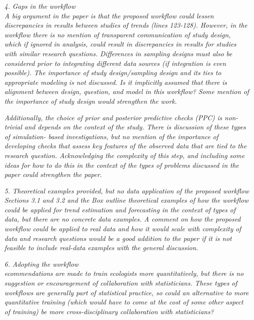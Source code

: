 \documentclass[11pt,letter]{article}
\begin{document}
\begin{mybox}
\emph{4. Gaps in the workflow\\
A big argument in the paper is that the proposed workflow
could lessen discrepancies in results between studies of trends (lines 123-128). However,
in the workflow there is no mention of transparent communication of study design, which
if ignored in analysis, could result in discrepancies in results for studies with similar
research questions. Differences in sampling designs must also be considered prior to
integrating different data sources (if integration is even possible). The importance of
study design/sampling design and its ties to appropriate modeling is not discussed. Is it
implicitly assumed that there is alignment between design, question, and model in this
workflow? Some mention of the importance of study design would strengthen the work.}
\end{mybox}

\begin{mybox}
\emph{Additionally, the choice of prior and posterior predictive checks (PPC) is non-trivial and
depends on the context of the study. There is discussion of these types of simulation-
based investigations, but no mention of the importance of developing checks that assess
key features of the observed data that are tied to the research question. Acknowledging
the complexity of this step, and including some ideas for how to do this in the context
of the types of problems discussed in the paper could strengthen the paper.}
\end{mybox}

\begin{mybox}
\emph{5. Theoretical examples provided, but no data application of the proposed workflow\\
Sections 3.1 and 3.2 and the Box outline theoretical examples of how the workflow
could be applied for trend estimation and forecasting in the context of types of data, but
there are no concrete data examples. A comment on how the proposed workflow could
be applied to real data and how it would scale with complexity of data and research
questions would be a good addition to the paper if it is not feasible to include real-data
examples with the general discussion.}
\end{mybox}

\begin{mybox}
\emph{6. Adopting the workflow\\
ecommendations are made to train ecologists more quantitatively, but there is no suggestion or encouragement of collaboration with statisticians. These types of workflows are generally part of statistical practice, so could an alternative to more quantitative training (which would have to come at the cost of some other aspect of training) be more cross-disciplinary collaboration with statisticians?}
\end{mybox}
\end{document}

